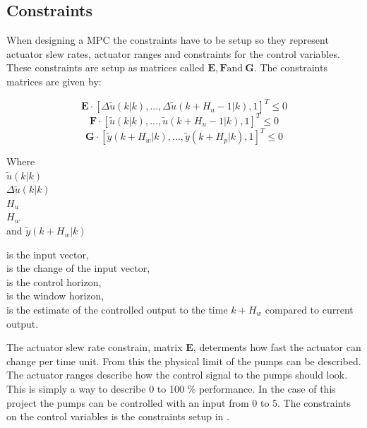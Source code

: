 

\subsection{Constraints}

When designing a MPC the constraints have to be setup so they represent actuator slew rates, actuator ranges and constraints for the control variables. These constraints are setup as matrices called $\pmb{E}, \pmb{F} \text{and} \:\pmb{G}$. The constraints matrices are given by: 

\begin{equation}
\pmb{E} \cdot [\Delta\tilde u(k|k),...,\Delta\tilde u(k+H_u-1|k),1]^T \leq 0 
\label{eq:slewrate}
\end{equation}
\begin{equation}
\pmb{F} \cdot [\tilde u(k|k),...,\tilde u(k+H_u-1|k),1]^T \leq 0 
\label{eq:actranges}
\end{equation}
\begin{equation}
\pmb{G} \cdot [\tilde y(k+H_w|k),...,\tilde y(k+H_p|k),1]^T \leq 0
\label{eq:controlvar}
\end{equation}


 \begin{minipage}[t]{0.20\textwidth}
 Where\\
 \hspace*{8mm} $\tilde u(k|k)$ \\
 \hspace*{8mm} $\Delta\tilde u(k|k)$ \\
 \hspace*{8mm} $H_u$ \\
 \hspace*{8mm} $H_w$ \\
 and \hspace*{0.7mm} $\tilde y(k+H_w|k)$	
 \end{minipage}
 \begin{minipage}[t]{0.68\textwidth}
 \vspace*{2mm}
 is the input vector, \\
 is the change of the input vector, \\
 is the control horizon, \\
 is the window horizon, \\
 is the estimate of the controlled output to the time $k+H_w$ compared to current output.
 \end{minipage}

The actuator slew rate constrain, matrix $\pmb{E}$, determents how fast the actuator can change per time unit. From this the physical limit of the pumps can be described. The actuator ranges describe how the control signal to the pumps should look. This is simply a way to describe 0 to 100 \% performance. In the case of this project the pumps can be controlled with an input from 0 to 5. The constraints on the control variables is the constraints setup in . 

